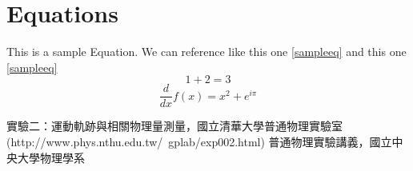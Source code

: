 \documentclass[11pt,a4paper]{report}
\begin{document}
	\section{Equations}
	This is a sample Equation. We can reference like this one \ref{sampleeq} and this one \eqref{sampleeq}
		\begin{equation}
			\label{sampleeq}
			1+2 = 3
		\end{equation}
		\begin{equation}
			\frac{d}{dx}f(x) = x^2 +e^{i\pi}
		\end{equation}
	
	
	\begin{thebibliography}{99}  
		
		實驗二：運動軌跡與相關物理量測量，國立清華大學普通物理實驗室(http://www.phys.nthu.edu.tw/~gplab/exp002.html)
		普通物理實驗講義，國立中央大學物理學系
		
	\end{thebibliography} 
\end{document}
